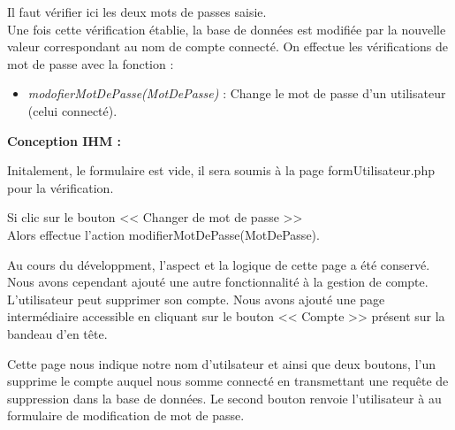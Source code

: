 			\begin{paragraphe}
                Il faut vérifier ici les deux mots de passes saisie. \\
                Une fois cette vérification établie, la base de données est modifiée par la nouvelle valeur correspondant au nom de compte connecté.
				On effectue les vérifications de mot de passe avec la fonction :
				\begin{itemize}
					\item \emph{modofierMotDePasse(MotDePasse)} : Change le mot de passe d'un utilisateur (celui connecté).
				\end{itemize}
			\end{paragraphe}

			\begin{paragraphe}
				\textbf{Conception IHM :}
			\end{paragraphe}

			\begin{paragraphe}
				Initalement, le formulaire est vide, il sera soumis à la page formUtilisateur.php pour la vérification.
			\end{paragraphe}


			\begin{paragraphe}
				Si clic sur le bouton << Changer de mot de passe >> \\
				Alors effectue l'action modifierMotDePasse(MotDePasse).
			\end{paragraphe}

        \newpage
        
            \begin{paragraphe}
               Au cours du développment, l'aspect et la logique de cette page a été conservé. Nous avons cependant ajouté une autre fonctionnalité
               à la gestion de compte. L'utilisateur peut supprimer son compte. Nous avons ajouté une page intermédiaire accessible en cliquant sur le bouton
               << Compte >> présent sur la bandeau d'en tête.
            \end{paragraphe}
               
            \begin{paragraphe}
                Cette page nous indique notre nom d'utilsateur et ainsi que deux boutons, l'un supprime le compte auquel nous somme connecté en transmettant une requête de suppression dans la
                base de données. Le second bouton renvoie l'utilisateur à au formulaire de modification de mot de passe.
            \end{paragraphe}

